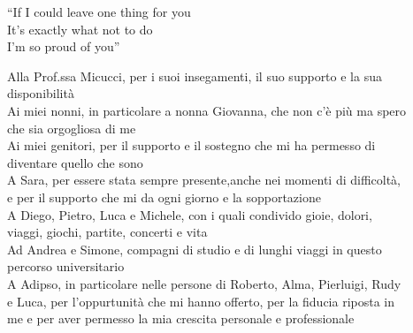 


\begingroup
  \let\clearpage\endgroup
  \null{}
  \begin{minipage}{5.3in} 
  
    \begin{flushright}
      \begin{em}
        ``If I could leave one thing for you\\
        It's exactly what not to do\\
        I'm so proud of you''
      \end{em}

      \vspace{4cm}

      \begin{em}
        Alla Prof.ssa Micucci, per i suoi insegamenti, il suo supporto e la sua\\disponibilità\\[10pt]

        Ai miei nonni, in particolare a nonna Giovanna, che non c'è più ma spero\\che sia orgogliosa di me\\[10pt]

        Ai miei genitori, per il supporto e il sostegno che mi ha permesso di\\diventare quello che sono\\[10pt]

        A Sara, per essere stata sempre presente,anche nei momenti di difficoltà,\\
        e per il supporto che mi da ogni giorno e la sopportazione\\[10pt]

        A Diego, Pietro, Luca e Michele, con i quali condivido gioie, dolori,\\
        viaggi, giochi, partite, concerti e vita\\[10pt]

        Ad Andrea e Simone, compagni di studio e di lunghi viaggi in questo\\
        percorso universitario\\[10pt]
        
        A Adipso, in particolare nelle persone di Roberto, Alma, Pierluigi, Rudy\\ 
        e Luca, per l'oppurtunità che mi hanno offerto, per la fiducia riposta in\\
        me e per aver permesso la mia crescita personale e professionale


      \end{em} 
    \end{flushright}
  \end{minipage}
   \null
\endgroup